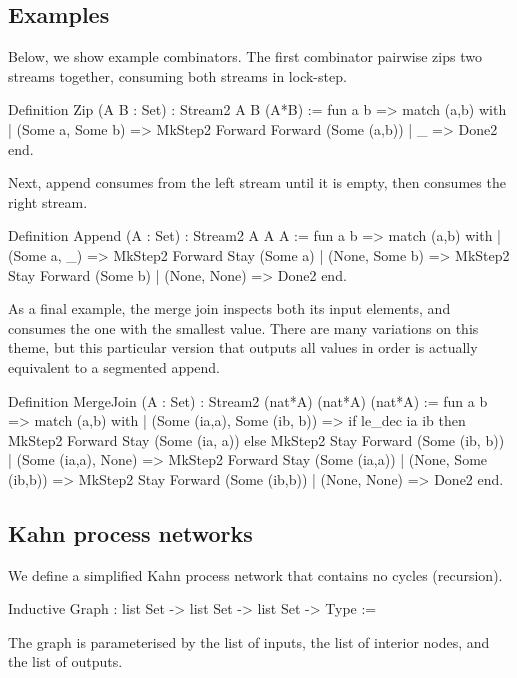 \subsection{Examples}

Below, we show example combinators.
The first combinator pairwise zips two streams together, consuming both streams in lock-step.

\begin{code}
Definition Zip (A B : Set)
 :  Stream2 A B (A*B)
 := fun a b =>
    match (a,b) with
    | (Some a, Some b)
    => MkStep2 Forward Forward (Some (a,b))
    | _               
    => Done2
    end.
\end{code}

Next, append consumes from the left stream until it is empty, then consumes the right stream.
\begin{code}
Definition Append (A : Set)
 :  Stream2 A A A
 := fun a b =>
    match (a,b) with
    | (Some a, _)
    => MkStep2 Forward Stay    (Some a)
    | (None,   Some b)
    => MkStep2 Stay    Forward (Some b)
    | (None,   None)               
    => Done2
    end.
\end{code}

As a final example, the merge join inspects both its input elements, and consumes the one with the smallest value.
There are many variations on this theme, but this particular version that outputs all values in order is actually equivalent to a segmented append.

\begin{code}
Definition MergeJoin (A : Set)
 :  Stream2 (nat*A) (nat*A) (nat*A)
 := fun a b =>
    match (a,b) with
    | (Some (ia,a), Some (ib, b))
    => if   le_dec ia ib
       then MkStep2 Forward Stay (Some (ia, a))
       else MkStep2 Stay Forward (Some (ib, b))
    | (Some (ia,a), None)
    =>      MkStep2 Forward Stay (Some (ia,a))
    | (None, Some (ib,b))
    =>      MkStep2 Stay Forward (Some (ib,b))
    | (None, None)
    =>      Done2
    end.
\end{code}



\subsection{Kahn process networks}

We define a simplified Kahn process network that contains no cycles (recursion). 

\begin{code}
Inductive Graph
 : list Set -> list Set -> list Set -> Type :=
\end{code}
The graph is parameterised by the list of inputs, the list of interior nodes, and the list of outputs.

